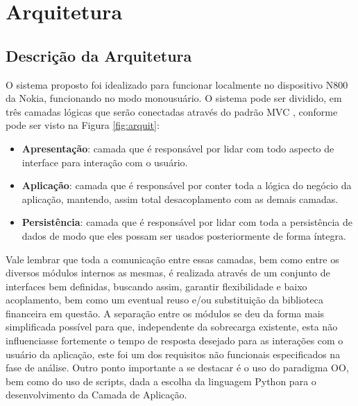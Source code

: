 \chapter{Arquitetura}


\section{Descrição da Arquitetura}

O sistema proposto foi idealizado para funcionar localmente no dispositivo N800 da Nokia, funcionando no modo monousuário. O sistema pode ser dividido, em três camadas lógicas que serão conectadas através do padrão MVC \cite{mvc}, conforme pode ser visto na Figura \ref{fig:arquit}:
\begin{itemize}
 \item \textbf{Apresentação}: camada que é responsável por lidar com todo aspecto de interface para interação com o usuário.
 \item \textbf{Aplicação}: camada que é responsável por conter toda a lógica do negócio da aplicação, mantendo, assim total desacoplamento com as demais camadas.
 \item \textbf{Persistência}: camada que é responsável por lidar com toda a persistência de dados de modo que eles possam ser usados posteriormente de forma íntegra.
\end{itemize}

Vale lembrar que toda a comunicação entre essas camadas, bem como entre os diversos módulos internos as mesmas, é realizada através de um conjunto de interfaces bem definidas, buscando assim, garantir flexibilidade e baixo acoplamento, bem como um eventual reuso e/ou substituição da biblioteca financeira em questão. A separação entre os módulos se deu da forma mais simplificada possível para que, independente da sobrecarga existente, esta não influenciasse fortemente o tempo de resposta desejado para as interações com o usuário da aplicação, este foi um dos requisitos não funcionais especificados na fase de análise.
Outro ponto importante a se destacar é o uso do paradigma OO, bem como do uso de scripts, dada a escolha da linguagem Python para o desenvolvimento da Camada de Aplicação.

